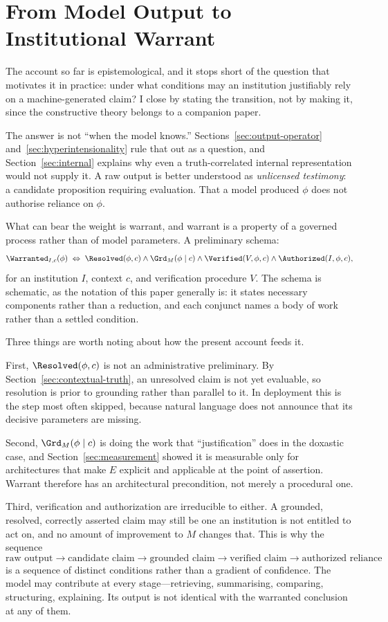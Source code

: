 \section{From Model Output to Institutional Warrant}
\label{sec:warrant}

The account so far is epistemological, and it stops short of the question that
motivates it in practice: under what conditions may an institution justifiably
rely on a machine-generated claim? I close by stating the transition, not by
making it, since the constructive theory belongs to a companion paper.

The answer is not ``when the model knows.'' Sections~\ref{sec:output-operator}
and~\ref{sec:hyperintensionality} rule that out as a question, and
Section~\ref{sec:internal} explains why even a truth-correlated internal
representation would not supply it. A raw output is better understood as
\emph{unlicensed testimony}: a candidate proposition requiring evaluation. That a
model produced $\phi$ does not authorise reliance on $\phi$.

What can bear the weight is warrant, and warrant is a property of a governed
process rather than of model parameters. A preliminary schema:
\begin{equation}
  \Warranted_{I,c}(\phi)
  \;\Leftrightarrow\;
  \Resolved(\phi, c) \wedge \Grd_M(\phi \mid c)
  \wedge \Verified(V, \phi, c) \wedge \Authorized(I, \phi, c),
  \label{eq:warrant}
\end{equation}
for an institution $I$, context $c$, and verification procedure $V$. The schema is
schematic, as the notation of this paper generally is: it states necessary
components rather than a reduction, and each conjunct names a body of work rather
than a settled condition.

Three things are worth noting about how the present account feeds it.

First, $\Resolved(\phi, c)$ is not an administrative preliminary. By
Section~\ref{sec:contextual-truth}, an unresolved claim is not yet evaluable, so
resolution is prior to grounding rather than parallel to it. In deployment this
is the step most often skipped, because natural language does not announce that
its decisive parameters are missing.

Second, $\Grd_M(\phi \mid c)$ is doing the work that ``justification'' does in the
doxastic case, and Section~\ref{sec:measurement} showed it is measurable only for
architectures that make $E$ explicit and applicable at the point of assertion.
Warrant therefore has an architectural precondition, not merely a procedural one.

Third, verification and authorization are irreducible to either. A grounded,
resolved, correctly asserted claim may still be one an institution is not
entitled to act on, and no amount of improvement to $M$ changes that. This is why
the sequence
\[
  \text{raw output} \rightarrow \text{candidate claim} \rightarrow
  \text{grounded claim} \rightarrow \text{verified claim} \rightarrow
  \text{authorized reliance}
\]
is a sequence of distinct conditions rather than a gradient of confidence. The
model may contribute at every stage---retrieving, summarising, comparing,
structuring, explaining. Its output is not identical with the warranted
conclusion at any of them.
